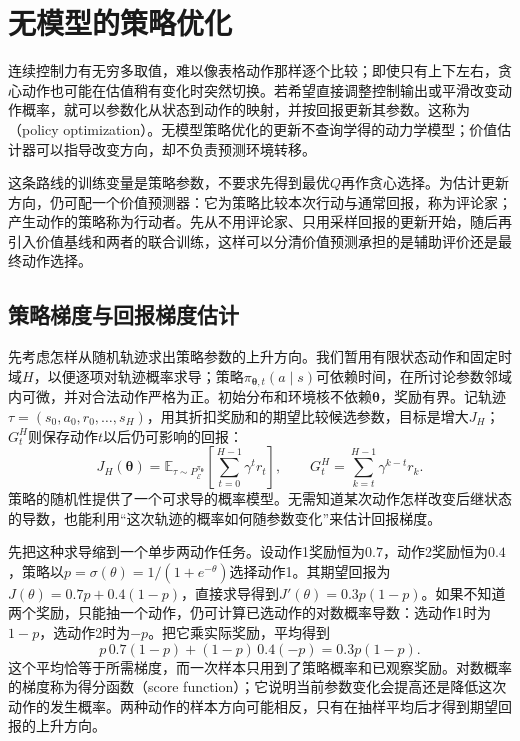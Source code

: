 \section{无模型的策略优化}
\label{sec:rl-learning-policy}

连续控制力有无穷多取值，难以像表格动作那样逐个比较；即使只有上下左右，贪心动作也可能在估值稍有变化时突然切换。若希望直接调整控制输出或平滑改变动作概率，就可以参数化从状态到动作的映射，并按回报更新其参数。这称为（policy optimization）。无模型策略优化的更新不查询学得的动力学模型；价值估计器可以指导改变方向，却不负责预测环境转移。

这条路线的训练变量是策略参数，不要求先得到最优$Q$再作贪心选择。为估计更新方向，仍可配一个价值预测器：它为策略比较本次行动与通常回报，称为评论家；产生动作的策略称为行动者。先从不用评论家、只用采样回报的更新开始，随后再引入价值基线和两者的联合训练，这样可以分清价值预测承担的是辅助评价还是最终动作选择。

\subsection{策略梯度与回报梯度估计}
\label{sec:rl-learning-policy-gradient}

先考虑怎样从随机轨迹求出策略参数的上升方向。我们暂用有限状态动作和固定时域$H$，以便逐项对轨迹概率求导；策略$\pi_{\bm\theta,t}(a\mid s)$可依赖时间，在所讨论参数邻域内可微，并对合法动作严格为正。初始分布和环境核不依赖$\bm\theta$，奖励有界。记轨迹$\tau=(s_0,a_0,r_0,\ldots,s_H)$，用其折扣奖励和的期望比较候选参数，目标是增大$J_H$；$G_t^H$则保存动作$t$以后仍可影响的回报：
\begin{equation}
  J_H(\bm\theta)=\mathbb E_{\tau\sim P_{\mathcal E}^{\pi_{\bm\theta}}}
      \left[\sum_{t=0}^{H-1}\gamma^t r_t\right],
  \qquad
  G_t^{H}=\sum_{k=t}^{H-1}\gamma^{k-t}r_k .
  \label{eq:rl-learning-finite-policy-objective}
\end{equation}
策略的随机性提供了一个可求导的概率模型。无需知道某次动作怎样改变后继状态的导数，也能利用“这次轨迹的概率如何随参数变化”来估计回报梯度。

先把这种求导缩到一个单步两动作任务。设动作1奖励恒为$0.7$，动作2奖励恒为$0.4$，策略以$p=\sigma(\theta)=1/(1+e^{-\theta})$选择动作1。其期望回报为$J(\theta)=0.7p+0.4(1-p)$，直接求导得到$J'(\theta)=0.3p(1-p)$。如果不知道两个奖励，只能抽一个动作，仍可计算已选动作的对数概率导数：选动作1时为$1-p$，选动作2时为$-p$。把它乘实际奖励，平均得到
\[
 p\,0.7(1-p)+(1-p)\,0.4(-p)=0.3p(1-p).
\]
这个平均恰等于所需梯度，而一次样本只用到了策略概率和已观察奖励。对数概率的梯度称为得分函数（score function）；它说明当前参数变化会提高还是降低这次动作的发生概率。两种动作的样本方向可能相反，只有在抽样平均后才得到期望回报的上升方向。

